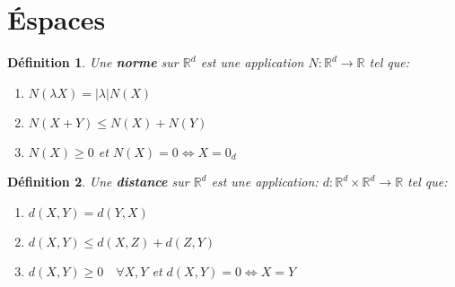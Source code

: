 \documentclass[a4paper]{article}
\newcommand{\R}{\mathbb{R}}
\newtheorem{definition}{Définition}[section]
\begin{document}
\section{Éspaces}
   \begin{definition}
       Une \textbf{norme} sur $\R^d$ est une application $N: \R^d \to \R$ tel que:
       \begin{enumerate}
           \item $N(\lambda X) = |\lambda|N(X)$
           \item  $N(X + Y) \le N(X) + N(Y)$
           \item $N(X) \ge 0$ et $N(X) = 0 \iff X = 0_d$
       \end{enumerate}
   \end{definition} 
   \begin{definition}
       Une \textbf{distance} sur $\R^d$ est une application:  $d: \R^d \times \R^d \to \R$ tel que:
       \begin{enumerate}
           \item $d(X, Y) = d(Y, X)$
           \item  $d(X, Y) \le d(X, Z) + d(Z, Y)$
           \item $d(X, Y) \ge 0 \quad \forall X,Y$ et $d(X,Y) = 0 \iff X = Y$
       \end{enumerate}
   \end{definition}
\end{document}

